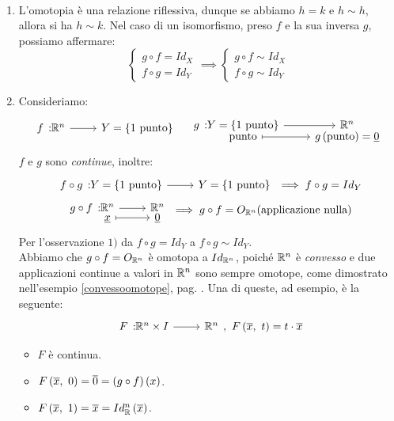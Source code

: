 \begin{demonstration}~{}
	\begin{enumerate}[label=\Roman*]
		\item L'omotopia è una relazione riflessiva, dunque se abbiamo $h=k$ e $h\sim h$, allora si ha $h\sim k$. Nel caso di un isomorfismo, preso $f$ e la sua inversa $g$, possiamo affermare:
		\begin{equation*}
			\begin{cases}
				g\circ f=Id_X\\
				f\circ g=Id_Y
			\end{cases}\implies
		\begin{cases}
			g\circ f\sim Id_X\\
			f\circ g\sim Id_Y
		\end{cases}
		\end{equation*}
	\item Consideriamo:
	\begin{equation}
		\funz{f}{\realset^n}{Y=\left\{1\text{ punto}\right\}}\quad\funztot{g}{Y=\left\{1\text{ punto}\right\}}{\realset^n}{\text{punto}}{g\left(\text{punto}\right)=\underline{0}}
	\end{equation}
$f$ e $g$ sono \textit{continue}, inoltre:
	\begin{gather*}
		\funz{f\circ g}{Y=\left\{1\text{ punto}\right\}}{Y=\left\{1\text{ punto}\right\}}\implies f\circ g= Id_Y\\
		\funztot{g\circ f}{\realset^n}{\realset^n}{\underline{x}}{\underline{0}}\implies g\circ f=O_{\realset^n} \text{(applicazione nulla)} 
	\end{gather*}
Per l'osservazione $1)$ da $f\circ g= Id_Y$ a $f\circ g\sim Id_Y$.\\
Abbiamo che $g\circ f=O_{\mathbb{R}^n}$ è omotopa a $Id_{\mathbb{R}^n}$, poiché $\mathbb{R}^n$ è \textit{convesso} e due applicazioni continue a valori in $\mathbb{R}^n$ sono sempre omotope, come dimostrato nell'esempio \ref{convessoomotope}, pag. \pageref{convessoomotope}. Una di queste, ad esempio, è la seguente:
\begin{equation*}
\funz{F}{\realset^n\times I}{\realset^n},\ \mvf{F}{\overline{x}}{t}=t\cdot \overline{x}
\end{equation*}
\begin{itemize}
	\item $F$ è continua.
	\item $F\left(\overline{x},\ 0\right)=\overline{0}=\left(g\circ f\right)\left(x\right)$.
	\item $F\left(\overline{x},\ 1\right)=\overline{x}=Id_{\mathbb{R}}^n\left(\overline{x}\right)$.
\end{itemize}
\end{enumerate}
\end{demonstration}
